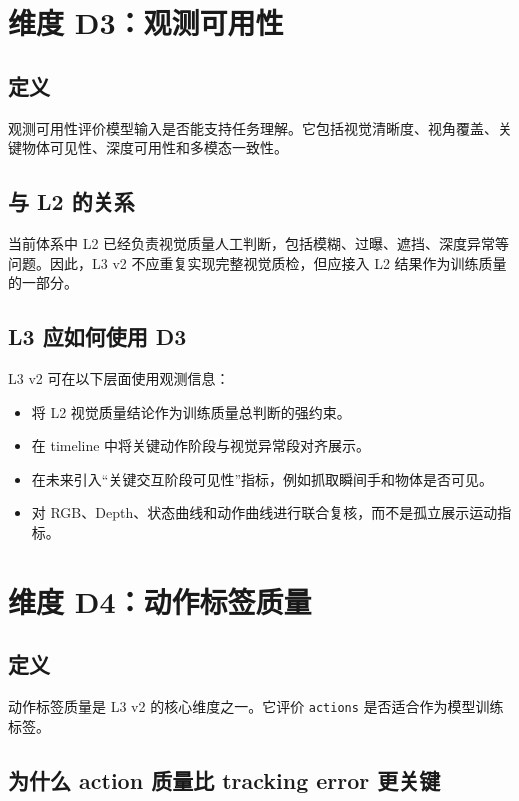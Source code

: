 \documentclass[UTF8,zihao=-4,oneside,openany]{ctexrep}
\begin{document}
\section{维度 D3：观测可用性}

\subsection{定义}

观测可用性评价模型输入是否能支持任务理解。它包括视觉清晰度、视角覆盖、关键物体可见性、深度可用性和多模态一致性。

\subsection{与 L2 的关系}

当前体系中 L2 已经负责视觉质量人工判断，包括模糊、过曝、遮挡、深度异常等问题。因此，L3 v2 不应重复实现完整视觉质检，但应接入 L2 结果作为训练质量的一部分。

\subsection{L3 应如何使用 D3}

L3 v2 可在以下层面使用观测信息：

\begin{itemize}
  \item 将 L2 视觉质量结论作为训练质量总判断的强约束。
  \item 在 timeline 中将关键动作阶段与视觉异常段对齐展示。
  \item 在未来引入“关键交互阶段可见性”指标，例如抓取瞬间手和物体是否可见。
  \item 对 RGB、Depth、状态曲线和动作曲线进行联合复核，而不是孤立展示运动指标。
\end{itemize}

\section{维度 D4：动作标签质量}

\subsection{定义}

动作标签质量是 L3 v2 的核心维度之一。它评价 \texttt{actions} 是否适合作为模型训练标签。

\subsection{为什么 action 质量比 tracking error 更关键}
\end{document}
